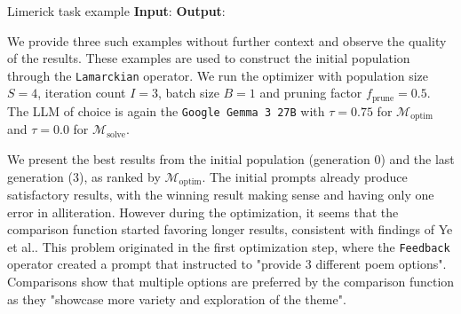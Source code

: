 \begin{promptbox}[label={box:limerick}]{Limerick task example}
    \textbf{Input}:
    \textbf{Output}:
\end{promptbox}

We provide three such examples without further context and observe the quality of the results. These examples are used to construct the initial population through
the \texttt{Lamarckian} operator.
We run the optimizer with population size $S=4$, iteration count $I=3$, batch size $B=1$ and pruning factor $f_{\text{prune}} = 0.5$.
The LLM of choice is again the \texttt{Google Gemma 3 27B} with $\tau = 0.75$ for $\mathcal{M}_{\text{optim}}$ and $\tau = 0.0$ for $\mathcal{M}_{\text{solve}}$.

We present the best results from the initial population (generation $0$) and the last generation ($3$), as ranked by $\mathcal{M}_{\text{optim}}$.
The initial prompts already produce satisfactory results, with the winning result making sense and having only one error in alliteration.
However during the optimization, it seems that the comparison function started favoring longer results, consistent with findings of Ye et al.\cite{ye2024justiceprejudicequantifyingbiases}.
This problem originated in the first optimization step, where the \texttt{Feedback} operator created a prompt that instructed to "provide 3 different poem options".
Comparisons show that multiple options are preferred by the comparison function as they "showcase more variety and exploration of the theme".

